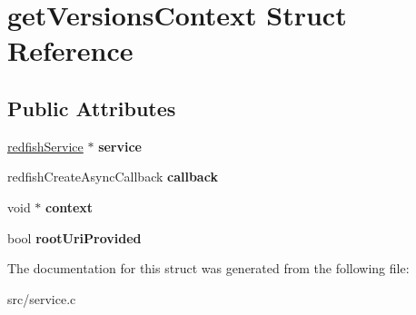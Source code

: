 \hypertarget{structgetVersionsContext}{}\section{get\+Versions\+Context Struct Reference}
\label{structgetVersionsContext}
\subsection*{Public Attributes}
\begin{DoxyCompactItemize}
\item 
\mbox{\label{structgetVersionsContext_aab4954a6f01ffff47feadd0024230ce1}} 
\hyperlink{redfishService_8h_a4c9115c0f0a21de971c0dfae06f26372}{redfish\+Service} $\ast$ {\bfseries service}
\item 
\mbox{\label{structgetVersionsContext_a4605c3158bbaf55290d05d519f56f94b}} 
redfish\+Create\+Async\+Callback {\bfseries callback}
\item 
\mbox{\label{structgetVersionsContext_ac98b42f2d50035f00edf63b8ef9a3113}} 
void $\ast$ {\bfseries context}
\item 
\mbox{\label{structgetVersionsContext_aa92af5790d5a49dc45b163892c600496}} 
bool {\bfseries root\+Uri\+Provided}
\end{DoxyCompactItemize}


The documentation for this struct was generated from the following file\+:\begin{DoxyCompactItemize}
\item 
src/service.\+c\end{DoxyCompactItemize}
